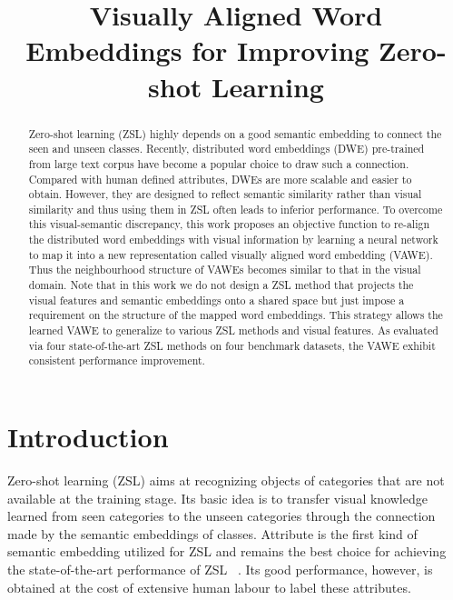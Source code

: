 \documentclass{bmvc2k}
\title{Visually Aligned Word Embeddings for Improving Zero-shot Learning}
\begin{document}
\maketitle

\begin{abstract}
Zero-shot learning (ZSL) highly depends on a good semantic embedding to connect the seen and unseen classes. Recently, distributed word embeddings (DWE) pre-trained from large text corpus have become a popular choice to draw such a connection. Compared with human defined attributes, DWEs are more scalable and easier to obtain. However, they are designed to reflect semantic similarity rather than visual similarity and thus using them in ZSL often leads to inferior performance. To overcome this visual-semantic discrepancy, this work proposes an objective function to re-align the distributed word embeddings with visual information by learning a neural network to map it into a new representation called visually aligned word embedding (VAWE). Thus the neighbourhood structure of VAWEs becomes similar to that in the visual domain.  Note that in this work we do not design a ZSL method that projects the visual features and semantic embeddings onto a shared space but just impose a requirement on the structure of the mapped word embeddings. This strategy allows the learned VAWE to generalize to various ZSL methods and visual features. As evaluated via four state-of-the-art ZSL methods on four benchmark datasets, the VAWE exhibit consistent performance improvement.
\end{abstract}



%
\section{Introduction}
\label{sec:intro}
Zero-shot learning (ZSL) aims at recognizing objects of categories that are not available at the training stage. Its basic idea is to transfer visual knowledge learned from seen categories to the unseen categories through the connection made by the semantic embeddings of classes. Attribute \cite{Farhadi09describingobjects} is the first kind of semantic embedding utilized for ZSL and remains the best choice for achieving the state-of-the-art performance of ZSL ~\cite{Akata15output,Zhang2015ICCV}. Its good performance, however, is obtained at the cost of extensive human labour to label these attributes.
\end{document}
